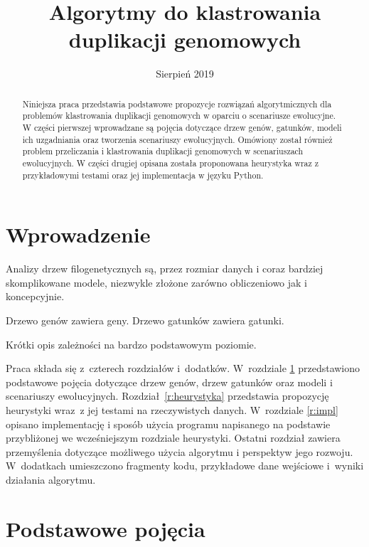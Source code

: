\documentclass[licencjacka]{pracamgr}
\title{Algorytmy do klastrowania duplikacji genomowych}
\date{Sierpień 2019}
\begin{document}
\maketitle


\begin{abstract}
   Niniejsza praca przedstawia podstawowe propozycje rozwiązań algorytmicznych dla problemów klastrowania duplikacji genomowych w oparciu o scenariusze ewolucyjne. W części pierwszej wprowadzane są pojęcia dotyczące drzew genów, gatunków, modeli ich uzgadniania oraz tworzenia scenariuszy ewolucyjnych. Omówiony został również problem przeliczania i klastrowania duplikacji genomowych w scenariuszach ewolucyjnych. W części drugiej opisana została proponowana heurystyka wraz z przykładowymi testami oraz jej implementacja w języku Python.
\end{abstract}


\renewcommand{\contentsname}{Spis Treści}
\tableofcontents

\chapter*{Wprowadzenie}


Analizy drzew filogenetycznych są, przez rozmiar danych i coraz bardziej skomplikowane modele, niezwykle złożone zarówno obliczeniowo jak i koncepcyjnie.


Drzewo genów zawiera geny.
Drzewo gatunków zawiera gatunki.


Krótki opis zależności na bardzo podstawowym poziomie.


Praca składa się z~czterech rozdziałów i~dodatków.
W~rozdziale \ref{r:pojecia} przedstawiono podstawowe pojęcia dotyczące drzew genów, drzew gatunków oraz modeli i scenariuszy ewolucyjnych.  
Rozdział~\ref{r:heurystyka} przedstawia propozycję heurystyki wraz~z jej testami na rzeczywistych danych.  W~rozdziale \ref{r:impl} opisano implementację i sposób użycia programu napisanego na podstawie przybliżonej we wcześniejszym rozdziale heurystyki.
Ostatni rozdział zawiera przemyślenia dotyczące możliwego użycia algorytmu i perspektyw jego rozwoju. W~dodatkach umieszczono fragmenty kodu, przykładowe dane wejściowe i~wyniki działania algorytmu.

\chapter{Podstawowe pojęcia}\label{r:pojecia}
\end{document}
